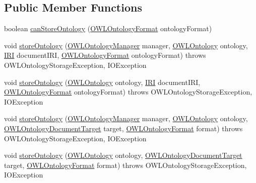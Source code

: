 \subsection*{Public Member Functions}
\begin{DoxyCompactItemize}
\item 
boolean \hyperlink{interfaceorg_1_1semanticweb_1_1owlapi_1_1model_1_1_o_w_l_ontology_storer_a7cdc556d90147cb44bee843514556e3c}{can\-Store\-Ontology} (\hyperlink{classorg_1_1semanticweb_1_1owlapi_1_1model_1_1_o_w_l_ontology_format}{O\-W\-L\-Ontology\-Format} ontology\-Format)
\item 
void \hyperlink{interfaceorg_1_1semanticweb_1_1owlapi_1_1model_1_1_o_w_l_ontology_storer_a792a5363908ebfc166263b16e7a30e6c}{store\-Ontology} (\hyperlink{interfaceorg_1_1semanticweb_1_1owlapi_1_1model_1_1_o_w_l_ontology_manager}{O\-W\-L\-Ontology\-Manager} manager, \hyperlink{interfaceorg_1_1semanticweb_1_1owlapi_1_1model_1_1_o_w_l_ontology}{O\-W\-L\-Ontology} ontology, \hyperlink{classorg_1_1semanticweb_1_1owlapi_1_1model_1_1_i_r_i}{I\-R\-I} document\-I\-R\-I, \hyperlink{classorg_1_1semanticweb_1_1owlapi_1_1model_1_1_o_w_l_ontology_format}{O\-W\-L\-Ontology\-Format} ontology\-Format)  throws O\-W\-L\-Ontology\-Storage\-Exception, I\-O\-Exception
\item 
void \hyperlink{interfaceorg_1_1semanticweb_1_1owlapi_1_1model_1_1_o_w_l_ontology_storer_a31b74166a2c1eadce4c95c5215639ecd}{store\-Ontology} (\hyperlink{interfaceorg_1_1semanticweb_1_1owlapi_1_1model_1_1_o_w_l_ontology}{O\-W\-L\-Ontology} ontology, \hyperlink{classorg_1_1semanticweb_1_1owlapi_1_1model_1_1_i_r_i}{I\-R\-I} document\-I\-R\-I, \hyperlink{classorg_1_1semanticweb_1_1owlapi_1_1model_1_1_o_w_l_ontology_format}{O\-W\-L\-Ontology\-Format} ontology\-Format)  throws O\-W\-L\-Ontology\-Storage\-Exception,             I\-O\-Exception
\item 
void \hyperlink{interfaceorg_1_1semanticweb_1_1owlapi_1_1model_1_1_o_w_l_ontology_storer_a0e2f835c421f9899637d13deaf7b62cb}{store\-Ontology} (\hyperlink{interfaceorg_1_1semanticweb_1_1owlapi_1_1model_1_1_o_w_l_ontology_manager}{O\-W\-L\-Ontology\-Manager} manager, \hyperlink{interfaceorg_1_1semanticweb_1_1owlapi_1_1model_1_1_o_w_l_ontology}{O\-W\-L\-Ontology} ontology, \hyperlink{interfaceorg_1_1semanticweb_1_1owlapi_1_1io_1_1_o_w_l_ontology_document_target}{O\-W\-L\-Ontology\-Document\-Target} target, \hyperlink{classorg_1_1semanticweb_1_1owlapi_1_1model_1_1_o_w_l_ontology_format}{O\-W\-L\-Ontology\-Format} format)  throws O\-W\-L\-Ontology\-Storage\-Exception, I\-O\-Exception
\item 
void \hyperlink{interfaceorg_1_1semanticweb_1_1owlapi_1_1model_1_1_o_w_l_ontology_storer_add4e69689c15928bcbe12e35f4c96082}{store\-Ontology} (\hyperlink{interfaceorg_1_1semanticweb_1_1owlapi_1_1model_1_1_o_w_l_ontology}{O\-W\-L\-Ontology} ontology, \hyperlink{interfaceorg_1_1semanticweb_1_1owlapi_1_1io_1_1_o_w_l_ontology_document_target}{O\-W\-L\-Ontology\-Document\-Target} target, \hyperlink{classorg_1_1semanticweb_1_1owlapi_1_1model_1_1_o_w_l_ontology_format}{O\-W\-L\-Ontology\-Format} format)  throws O\-W\-L\-Ontology\-Storage\-Exception, I\-O\-Exception
\end{DoxyCompactItemize}


